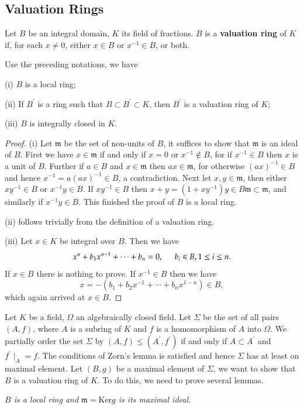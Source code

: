 \subsection{Valuation Rings}
Let $B$ be an integral domain, $K$ its field of fractions. $B$ is a \textbf{valuation ring} of $K$ if, for each $x\ne 0$, either $x\in B$ or $x^{-1}\in B$, or both.
\begin{proposition}
Use the preceding notations, we have \par
(i) $B$ is a local ring;\par
(ii) If $B^\prime$ is a ring such that $B\subset B^\prime\subset K$, then $B^\prime$ is a valuation ring of $K$;\par
(iii) $B$ is integrally closed in $K$.
\end{proposition}
\begin{proof}
(i) Let $\mathfrak{m}$ be the set of non-units of $B$, it suffices to show that $\mathfrak{m}$ is an ideal of $B$. First we have $x\in\mathfrak{m}$ if and only if $x=0$ or $x^{-1}\notin B$, for if $x^{-1}\in B$ then $x$ is a unit of $B$. Further if $a\in B$ and $x\in\mathfrak{m}$ then $ax\in\mathfrak{m}$, for otherwise $(ax)^{-1}\in B$ and hence $x^{-1}=a(ax)^{-1}\in B$, a contradiction. Next let $x,y\in\mathfrak{m}$, then either $xy^{-1}\in B$ or $x^{-1}y\in B$. If $xy^{-1}\in B$ then $x+y=(1+xy^{-1})y\in B\mathfrak{m}\subset\mathfrak{m}$, and similarly if $x^{-1}y\in B$. This finished the proof of $B$ is a local ring.\par
(ii) follows trivially from the definition of a valuation ring.\par
(iii) Let $x\in K$ be integral over $B$. Then we have 
$$
x^n+b_1x^{n-1}+\cdots +b_n=0,\hspace{0.5cm}b_i\in B,1\le i\le n.
$$
If $x\in B$ there is nothing to prove. If $x^{-1}\in B$ then we have 
$$
x=-\left( b_1+b_2x^{-1}+\cdots +b_nx^{1-n} \right) \in B,
$$
which again arrived at $x\in B$.
\end{proof}
Let $K$ be a field, $\Omega$ an algebraically closed field. Let $\Sigma$ be the set of all pairs $(A,f)$, where $A$ is a subring of $K$ and $f$ is a homomorphism of $A$ into $\Omega$. We partially order the set $\Sigma$ by $(A,f)\le (A^\prime,f^\prime)$ if and only if $A\subset A^\prime$ and $f^\prime\mid_A=f$. The conditions of Zorn's lemma is satisfied and hence $\Sigma$ has at least on maximal element. Let $(B,g)$ be a maximal element of $\Sigma$, we want to show that $B$ is a valuation ring of $K$. To do this, we need to prove several lemmas.
\begin{lemma}\em
$B$ is a local ring and $\mathfrak{m}=\mathrm{Ker}g$ is its maximal ideal.
\end{lemma}
